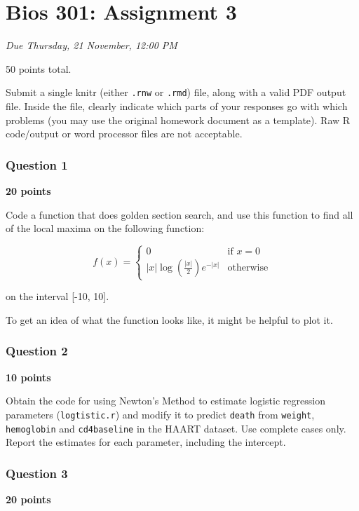 \documentclass[]{article}
\author{}
\date{}
\begin{document}
\section{Bios 301: Assignment 3}

\emph{Due Thursday, 21 November, 12:00 PM}

50 points total.

Submit a single knitr (either \texttt{.rnw} or \texttt{.rmd}) file,
along with a valid PDF output file. Inside the file, clearly indicate
which parts of your responses go with which problems (you may use the
original homework document as a template). Raw R code/output or word
processor files are not acceptable.

\subsubsection{Question 1}

\textbf{20 points}

Code a function that does golden section search, and use this function
to find all of the local maxima on the following function:

\[
f(x) = \left\{\begin{array}{lr}0 & \text{if } x=0 \\
|x| \log\left(\frac{|x|}{2}\right)e^{-|x|} & \text{otherwise}
\end{array}\right.\]

on the interval [-10, 10].

To get an idea of what the function looks like, it might be helpful to
plot it.

\subsubsection{Question 2}

\textbf{10 points}

Obtain the code for using Newton's Method to estimate logistic
regression parameters (\texttt{logtistic.r}) and modify it to predict
\texttt{death} from \texttt{weight}, \texttt{hemoglobin} and
\texttt{cd4baseline} in the HAART dataset. Use complete cases only.
Report the estimates for each parameter, including the intercept.

\subsubsection{Question 3}

\textbf{20 points}
\end{document}

